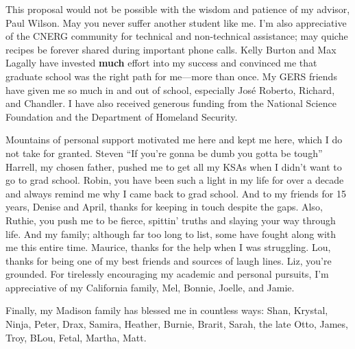 \footnotesize{
This proposal would not be possible with the wisdom and patience of my advisor,
Paul Wilson. May you never suffer another student like me.  I'm also
appreciative of the CNERG community for technical and non-technical assistance;
may quiche recipes be forever shared during important phone calls.  Kelly
Burton and Max Lagally have invested \textbf{much} effort into my success and
convinced me that graduate school was the right path for me---more than once.
My GERS friends have given me so much in and out of school, especially Jos\'e
Roberto, Richard, and Chandler.  I have also received generous funding from the
National Science Foundation and the Department of Homeland Security.

Mountains of personal support motivated me here and kept me here, which I do
not take for granted. Steven ``If you're gonna be dumb you gotta be tough''
Harrell, my chosen father, pushed me to get all my KSAs when I didn't want to
go to grad school.  Robin, you have been such a light in my life for over a
decade and always remind me why I came back to grad school.  And to my friends
for 15 years, Denise and April, thanks for keeping in touch despite the gaps.
Also, Ruthie, you push me to be fierce, spittin' truths and slaying your way
through life.  And my family; although far too long to list, some have fought
along with me this entire time.  Maurice, thanks for the help when I was
struggling.  Lou, thanks for being one of my best friends and sources of laugh
lines. Liz, you're grounded.  For tirelessly encouraging my academic and
personal pursuits, I'm appreciative of my California family, Mel, Bonnie,
Joelle, and Jamie. 

Finally, my Madison family has blessed me in countless ways: Shan, Krystal,
Ninja, Peter, Drax, Samira, Heather, Burnie, Brarit, Sarah, the late Otto,
James, Troy, BLou, Fetal, Martha, Matt.
}

